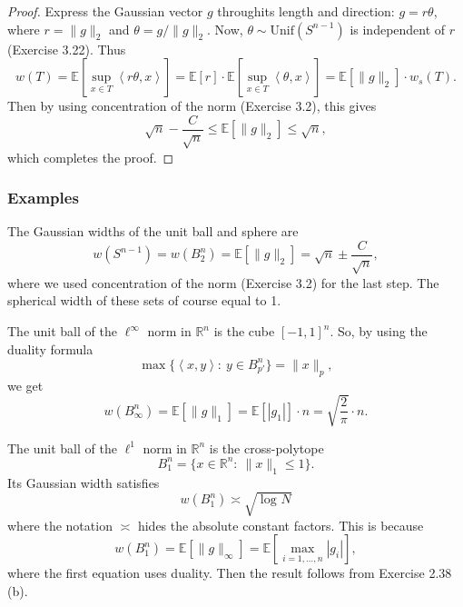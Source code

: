 \begin{proof}
Express the Gaussian vector $g$ throughits length and direction: $g = r \theta$, where $r = \lVert g \rVert_{2}$ 
and $\theta = g / \lVert g \rVert_{2}$. Now, $\theta \sim \mathrm{Unif}(S^{n - 1})$ is independent of $r$ 
(Exercise 3.22). Thus 
\[ w(T) = \mathbb{E}\left[ \sup_{x \in T} \left\langle r \theta, x \right\rangle \right] 
= \mathbb{E}\left[ r \right] \cdot \mathbb{E}\left[ \sup_{x \in T}\left\langle \theta, x \right\rangle \right]
= \mathbb{E}\left[ \lVert g \rVert_{2} \right] \cdot w_s(T). \]
Then by using concentration of the norm (Exercise 3.2), this gives 
\[ \sqrt{n} - \frac{C}{\sqrt{n}} \leq \mathbb{E}\left[ \lVert g \rVert_{2} \right] \leq \sqrt{n}, \]
which completes the proof.
\end{proof}


\subsubsection{Examples}
\begin{example}
\label{ex:7.5.6}
The Gaussian widths of the unit ball and sphere are 
\[ w(S^{n - 1}) = w(B_2^n) = \mathbb{E}\left[ \lVert g \rVert_{2} \right] = \sqrt{n} \pm \frac{C}{\sqrt{n}}, \]
where we used concentration of the norm (Exercise 3.2) for the last step. The spherical width of these sets 
of course equal to 1.
\end{example}

\begin{example}[Cube]
\label{ex:7.5.7}
The unit ball of the $\ell^\infty$ norm in $\mathbb{R}^n$ is the cube $[-1, 1]^n$. So, by using the duality 
formula 
\[ \max_{}\{ \left\langle x, y \right\rangle: \ y \in B_{p'}^n \} = \lVert x \rVert_{p}, \]
we get 
\[ w(B_{\infty}^n) = \mathbb{E}\left[ \lVert g \rVert_{1} \right] 
= \mathbb{E}\left[ |g_1| \right] \cdot n = \sqrt{\frac{2}{\pi}} \cdot n. \]
\end{example}

\begin{example}
\label{ex:7.5.8}
The unit ball of the $\ell^1$ norm in $\mathbb{R}^n$ is the cross-polytope 
\[ B_1^n = \{ x \in \mathbb{R}^n: \ \lVert x \rVert_{1} \leq 1 \}. \]
Its Gaussian width satisfies 
\[ w(B_1^n) \asymp \sqrt{\log_{}{N}} \]
where the notation $\asymp$ hides the absolute constant factors. This is because 
\[ w(B_1^n) = \mathbb{E}\left[ \lVert g \rVert_{\infty} \right] = \mathbb{E}\left[ \max_{i = 1, \dots, n} 
|g_i| \right], \]
where the first equation uses duality. Then the result follows from Exercise 2.38 (b).
\end{example}

